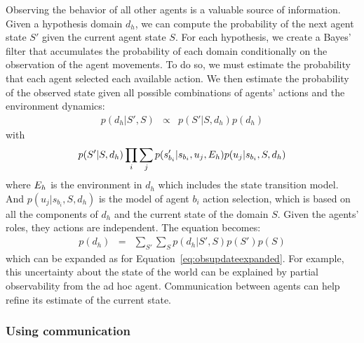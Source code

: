 Observing the behavior of all other agents is a valuable source of information. Given a hypothesis domain $d_h$, we can compute the probability of the next agent state $S'$ given the current agent state $S$. For each hypothesis, we create a Bayes' filter that accumulates the probability of each domain conditionally on the observation of the agent movements.
To do so, we must estimate the probability that each agent selected each available action. We then estimate the probability of the observed state given all possible combinations of agents' actions and the environment dynamics:
%
\begin{eqnarray}
p(d_h|S',S) &\propto& p(S'|S,d_h) p(d_h)
\label{eq:obsupdate}
\end{eqnarray}
%
with
%
\begin{eqnarray}
p(S'|S,d_h) \prod_i \sum_j p(s'_{b_i}|s_{b_i},u_j,E_h) p(u_j|s_{b_i}, S, d_h)
\label{eq:obsupdateexpanded}
\end{eqnarray}
%
where $E_h$ is the environment in $d_h$ which includes the state transition model. And $p(u_j|s_{b_i}, S, d_h)$ is the model of agent $b_i$ action selection, which is based on all the components of $d_h$ and the current state of the domain $S$. Given the agents' roles, they actions are independent. %
The equation becomes:
%
\begin{eqnarray}
p(d_h) &=& \sum_{S'} \sum_S p(d_h|S',S) p(S') p(S)
\label{eq:obsupdatestateprob}
\end{eqnarray}
%
which can be expanded as for Equation~\ref{eq:obsupdateexpanded}. For example, this uncertainty about the state of the world can be explained by partial observability from the ad hoc agent. Communication between agents can help refine its estimate of the current state.

\subsubsection{Using communication}

